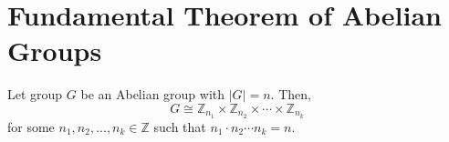 \chapter{Fundamental Theorem of Abelian Groups}

\begin{theorem}
    Let group \(G\) be an Abelian group with \(|G| = n\). Then,
    \[
        G \cong \mathbb{Z}_{n_1} \times \mathbb{Z}_{n_2} \times \cdots \times \mathbb{Z}_{n_k}
    \]
    for some \(n_1, n_2, ..., n_k \in \mathbb{Z}\) such that \(n_1 \cdot n_2 \cdots n_k = n\).
\end{theorem}
